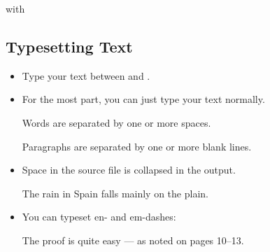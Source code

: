 \documentclass{beamer}
\begin{document}
\begin{frame}[fragile]{\insertsubsection{} with \wllogo}
\end{frame}

\subsection{Typesetting Text}
\begin{frame}[fragile]{\insertsubsection{}}
\small
\begin{itemize}
\item Type your text between  and .
\item For the most part, you can just type your text normally.
\begin{exampletwouptiny}
Words are separated by one or more
spaces.

Paragraphs are separated by one
or more blank lines.
\end{exampletwouptiny}
\item Space in the source file is collapsed in the output.
\begin{exampletwouptiny}
  The   rain       in Spain
  falls mainly on the plain.
\end{exampletwouptiny}

\item You can typeset en- and em-dashes:
\begin{exampletwouptiny}
  The proof is quite easy ---
    as noted on pages 10--13.
\end{exampletwouptiny}
\end{itemize}
\end{frame}
\end{document}
